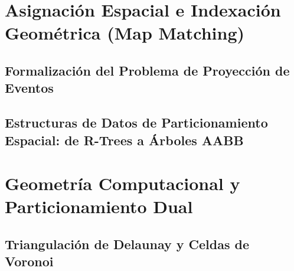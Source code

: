 \section{Asignación Espacial e Indexación Geométrica (Map Matching)}

\subsection{Formalización del Problema de Proyección de Eventos}
%

\subsection{Estructuras de Datos de Particionamiento Espacial: de R-Trees a Árboles AABB}
%


\section{Geometría Computacional y Particionamiento Dual}

\subsection{Triangulación de Delaunay y Celdas de Voronoi}
%

